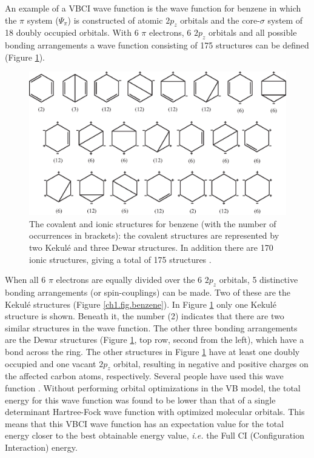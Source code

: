 An example of a VBCI wave function is the wave function for benzene in which the $\pi$ system ($\Psi_{\pi}$) is constructed of atomic $2p_z$ orbitals and the core-$\sigma$ system of 18 doubly occupied orbitals. With 6 $\pi$ electrons, 6 $2p_z$ orbitals and all possible bonding arrangements a wave function consisting of 175 structures can be defined (Figure \ref{ch1.fig.structures2}). 
\begin{figure}[htbp]
\center
\includegraphics[scale=0.9]{introduction/figures/allstructures.eps}
\caption{The covalent and ionic structures for benzene (with the number of occurrences in brackets): the covalent structures are represented by two Kekul\'e and three Dewar structures. In addition there are 170 ionic structures, giving a total of 175 structures \cite{chembrit}.}
\label{ch1.fig.structures2}
\end{figure}
When all 6 $\pi$ electrons are equally divided over the 6 $2p_z$ orbitals, 5 distinctive bonding arrangements (or spin-couplings) can be made. Two of these are the Kekul\'e structures (Figure \ref{ch1.fig.benzene}). In Figure \ref{ch1.fig.structures2} only one Kekul\'e structure is shown. Beneath it, the number (2) indicates that there are two similar structures in the wave function. The other three bonding arrangements are the Dewar structures (Figure \ref{ch1.fig.structures2}, top row, second from the left), which have a bond across the ring. The other structures in Figure \ref{ch1.fig.structures2} have at least one doubly occupied and one vacant $2p_z$ orbital, resulting in negative and positive charges on the affected carbon atoms, respectively. Several people have used this wave function \cite{vbci175_1,vbci175_2}. Without performing orbital optimizations in the VB model, the total energy for this wave function was found to be lower than that of a single determinant Hartree-Fock wave function with optimized molecular orbitals. This means that this VBCI wave function has an expectation value for the total energy closer to the best obtainable energy value, \textit{i.e.} the Full CI (Configuration Interaction) energy. 

